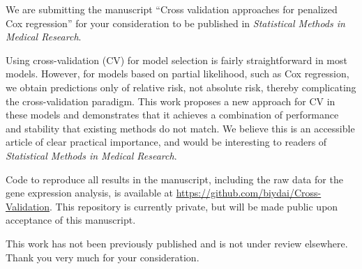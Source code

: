 \documentclass{uiletter}
\begin{document}

We are submitting the manuscript ``Cross validation approaches for penalized Cox regression'' for your consideration to be published in {\em Statistical Methods in Medical Research}.

Using cross-validation (CV) for model selection is fairly straightforward in most models.  However, for models based on partial likelihood, such as Cox regression, we obtain predictions only of relative risk, not absolute risk, thereby complicating the cross-validation paradigm.  This work proposes a new approach for CV in these models and demonstrates that it achieves a combination of performance and stability that existing methods do not match.  We believe this is an accessible article of clear practical importance, and would be interesting to readers of {\em Statistical Methods in Medical Research}.

Code to reproduce all results in the manuscript, including the raw data for the gene expression analysis, is available at \url{https://github.com/biydai/Cross-Validation}.  This repository is currently private, but will be made public upon acceptance of this manuscript.

This work has not been previously published and is not under review elsewhere.  Thank you very much for your consideration.

\EndLetter
\end{document}
